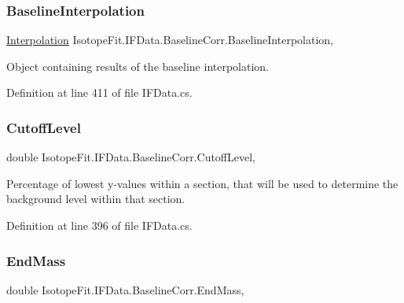 \subsubsection{\texorpdfstring{Baseline\+Interpolation}{BaselineInterpolation}}
{\footnotesize\ttfamily \mbox{\hyperlink{class_isotope_fit_1_1_interpolation}{Interpolation}} Isotope\+Fit.\+I\+F\+Data.\+Baseline\+Corr.\+Baseline\+Interpolation\hspace{0.3cm}{\ttfamily [get]}, {\ttfamily [set]}}



Object containing results of the baseline interpolation. 



Definition at line 411 of file I\+F\+Data.\+cs.

\mbox{\label{class_isotope_fit_1_1_i_f_data_1_1_baseline_corr_a74196174b782a5c1b7a7f4377b0ff451}} 
\subsubsection{\texorpdfstring{Cutoff\+Level}{CutoffLevel}}
{\footnotesize\ttfamily double Isotope\+Fit.\+I\+F\+Data.\+Baseline\+Corr.\+Cutoff\+Level\hspace{0.3cm}{\ttfamily [get]}, {\ttfamily [set]}}



Percentage of lowest y-\/values within a section, that will be used to determine the background level within that section. 



Definition at line 396 of file I\+F\+Data.\+cs.

\mbox{\label{class_isotope_fit_1_1_i_f_data_1_1_baseline_corr_a3ddf6fd1df96bc69336b4b6822ad7e4f}} 
\subsubsection{\texorpdfstring{End\+Mass}{EndMass}}
{\footnotesize\ttfamily double Isotope\+Fit.\+I\+F\+Data.\+Baseline\+Corr.\+End\+Mass\hspace{0.3cm}{\ttfamily [get]}, {\ttfamily [set]}}



